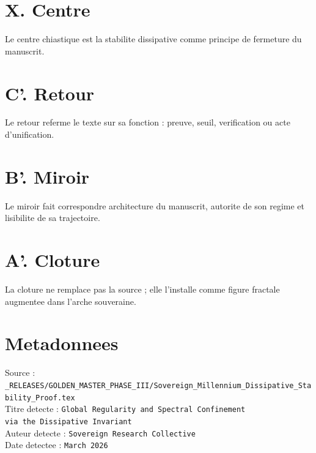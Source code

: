 \documentclass[11pt,a4paper]{article}
\begin{document}
\section*{X. Centre}
Le centre chiastique est la stabilite dissipative comme principe de fermeture du manuscrit.

\section*{C'. Retour}
Le retour referme le texte sur sa fonction : preuve, seuil, verification ou acte d'unification.

\section*{B'. Miroir}
Le miroir fait correspondre architecture du manuscrit, autorite de son regime et lisibilite de sa trajectoire.

\section*{A'. Cloture}
La cloture ne remplace pas la source ; elle l'installe comme figure fractale augmentee dans l'arche souveraine.

\section*{Metadonnees}
Source : \texttt{_RELEASES/GOLDEN_MASTER_PHASE_III/Sovereign_Millennium_Dissipative_Stability_Proof.tex}\\
Titre detecte : \texttt{Global Regularity and Spectral Confinement\\ via the Dissipative Invariant}\\
Auteur detecte : \texttt{Sovereign Research Collective}\\
Date detectee : \texttt{March 2026}
\end{document}
